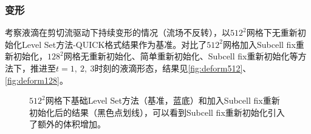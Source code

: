 \documentclass[11pt]{article}
\begin{document}
\subsubsection{变形}
考察液滴在剪切流驱动下持续变形的情况（流场不反转），以$512^2$网格下无重新初始化Level Set方法-QUICK格式结果作为基准。对比了$512^2$网格加入Subcell fix重新初始化，$128^2$网格无重新初始化、简单重新初始化、Subcell fix重新初始化等方法下，推进至$t=1,\ 2,\ 3$时刻的液滴形态，结果见\autoref{fig:deform512}、\autoref{fig:deform128}。

\begin{figure}[h]
    \centering
    \caption{\label{fig:deform512}$512^2$网格下基础Level Set方法（基准，蓝底）和加入Subcell fix重新初始化后的结果（黑色点划线），可以看到Subcell fix重新初始化引入了额外的体积增加。}
\end{figure}
\end{document}
